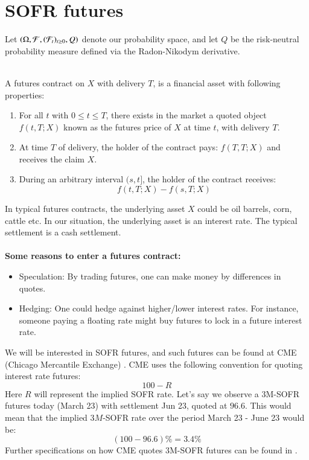 \newpage 

\section{SOFR futures}
Let $(\Omega, \mathcal{F}, (\mathcal{F}_{t})_{t\geq 0}, Q)$ denote our probability space, and let $Q$ be the risk-neutral probability measure defined via the Radon-Nikodym derivative.
\\~\\
\begin{definition}
A futures contract on $X$ with delivery $T$, is a financial asset with following properties: 
\begin{enumerate}[leftmargin =*]
    \item For all $t$ with $0\leq t \leq T$, there exists in the market a quoted object $f(t,T;X)$ known as the futures price of $X$ at time $t$, with delivery $T$. 
    \item At time $T$ of delivery, the holder of the contract pays: $f(T,T;X)$ and receives the claim $X$.
    \item During an arbitrary interval $(s,t]$, the holder of the contract receives: 
    \[
    f(t,T;X) - f(s,T;X)
    \]
\end{enumerate}
\end{definition}

In typical futures contracts, the underlying asset  
$X$ could be oil barrels, corn, cattle etc. In our situation, the underlying asset is an interest rate. The typical settlement is a cash settlement. 
\\~\\ 
\textbf{Some reasons to enter a futures contract:}
\begin{itemize}
    \item Speculation: By trading futures, one can make money by differences in quotes.  
    \item Hedging: One could hedge against higher/lower interest rates. For instance, someone paying a floating rate might buy futures to lock in a future interest rate. 
\end{itemize}



We will be interested in SOFR futures, and such futures can be found at CME (Chicago Mercantile Exchange) . CME uses the following convention for quoting interest rate futures: 
\[
100 - R
\]
Here $R$ will represent the implied SOFR rate. Let's say we observe a 3M-SOFR futures today (March 23) with settlement Jun 23, quoted at $96.6$. This would mean that the implied $3M$-SOFR rate over the period March 23 - June 23 would be: 
\[
(100-96.6)\% = 3.4\% 
\] 
Further specifications on how CME quotes 3M-SOFR futures can be found in  \cite{cmegroup-sofr-futures}. 

